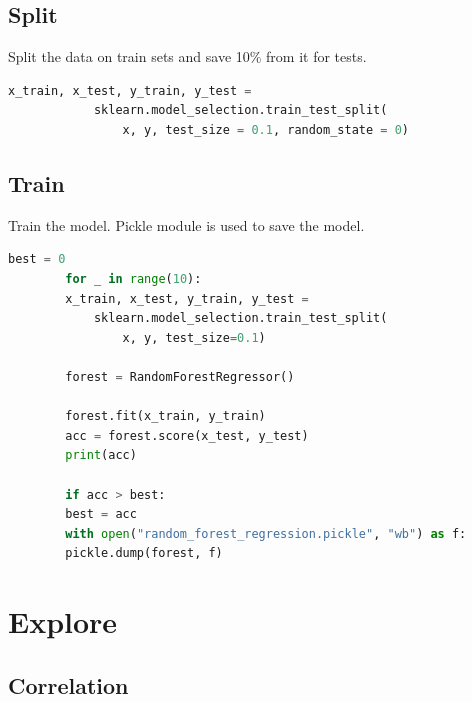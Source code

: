 \documentclass{article}
\begin{document}
    \subsection{Split}
    Split the data on train sets and save 10\% from it for tests.
    \begin{lstlisting}[language=Python]
        x_train, x_test, y_train, y_test =
            sklearn.model_selection.train_test_split(
                x, y, test_size = 0.1, random_state = 0)
    \end{lstlisting}
    \subsection{Train}
    Train the model.
    Pickle module is used to save the model.
    \begin{lstlisting}[language=Python]
        best = 0
        for _ in range(10):
        x_train, x_test, y_train, y_test =
            sklearn.model_selection.train_test_split(
                x, y, test_size=0.1)

        forest = RandomForestRegressor()

        forest.fit(x_train, y_train)
        acc = forest.score(x_test, y_test)
        print(acc)

        if acc > best:
        best = acc
        with open("random_forest_regression.pickle", "wb") as f:
        pickle.dump(forest, f)
    \end{lstlisting}
    \newpage




    \section{Explore}
    \subsection{Correlation}
\end{document}
